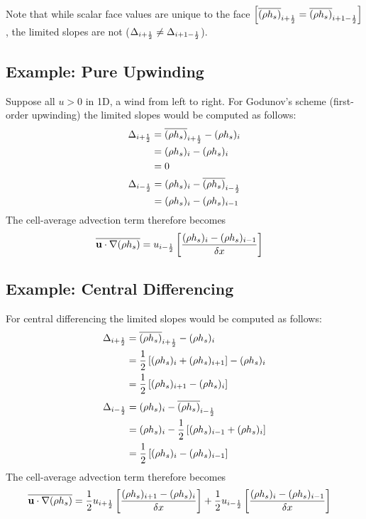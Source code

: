 Note that while scalar face values are unique to the face $\left[\overline{(\rho h_s)}_{i+\mbox{\tiny $\frac{1}{2}$}} = \overline{(\rho h_s)}_{i+1-\mbox{\tiny $\frac{1}{2}$}}\right]$, the limited slopes are not ($\Delta_{i+\mbox{\tiny $\frac{1}{2}$}} \ne \Delta_{i+1-\mbox{\tiny $\frac{1}{2}$}}$).

\subsection{Example: Pure Upwinding}
Suppose all $u>0$ in 1D, a wind from left to right.  For Godunov's scheme (first-order upwinding) the limited slopes would be computed as follows:
\begin{align}
\Delta_{i+\mbox{\tiny $\frac{1}{2}$}} &= \overline{(\rho h_s)}_{i+\mbox{\tiny $\frac{1}{2}$}} - (\rho h_s)_i \notag\\
&= (\rho h_s)_i - (\rho h_s)_i \notag\\
&= 0
\end{align}
\begin{align}
\Delta_{i-\mbox{\tiny $\frac{1}{2}$}} &= (\rho h_s)_i - \overline{(\rho h_s)}_{i-\mbox{\tiny $\frac{1}{2}$}} \notag\\
&= (\rho h_s)_i - (\rho h_s)_{i-1}
\end{align}
The cell-average advection term therefore becomes
\begin{align}
\overline{\mathbf{u}\cdot\nabla(\rho h_s)} &= u_{i-\mbox{\tiny $\frac{1}{2}$}} \left[ \frac{(\rho h_s)_i - (\rho h_s)_{i-1}}{\delta x} \right]
\end{align}

\subsection{Example: Central Differencing}
For central differencing the limited slopes would be computed as follows:
\begin{align}
\Delta_{i+\mbox{\tiny $\frac{1}{2}$}} &= \overline{(\rho h_s)}_{i+\mbox{\tiny $\frac{1}{2}$}} - (\rho h_s)_i \notag\\
&= \frac{1}{2}\left[(\rho h_s)_i + (\rho h_s)_{i+1}\right] - (\rho h_s)_i \notag\\
&= \frac{1}{2}\left[(\rho h_s)_{i+1} - (\rho h_s)_i\right]
\end{align}
\begin{align}
\Delta_{i-\mbox{\tiny $\frac{1}{2}$}} &= (\rho h_s)_i - \overline{(\rho h_s)}_{i-\mbox{\tiny $\frac{1}{2}$}} \notag\\
&= (\rho h_s)_i - \frac{1}{2}\left[(\rho h_s)_{i-1} + (\rho h_s)_i\right] \notag\\
&= \frac{1}{2}\left[ (\rho h_s)_i - (\rho h_s)_{i-1} \right]
\end{align}
The cell-average advection term therefore becomes
\begin{align}
\overline{\mathbf{u}\cdot\nabla(\rho h_s)} &= \frac{1}{2}  u_{i+\mbox{\tiny $\frac{1}{2}$}} \left[ \frac{(\rho h_s)_{i+1} - (\rho h_s)_i}{\delta x} \right] + \frac{1}{2} u_{i-\mbox{\tiny $\frac{1}{2}$}} \left[ \frac{(\rho h_s)_i - (\rho h_s)_{i-1}}{\delta x} \right]
\end{align}

